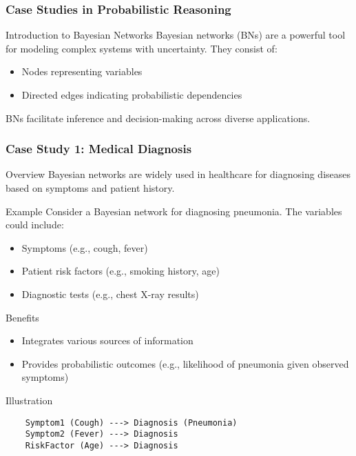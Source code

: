 \documentclass[aspectratio=169]{beamer}
\begin{document}
\begin{frame}[fragile]
    \frametitle{Case Studies in Probabilistic Reasoning}
    \begin{block}{Introduction to Bayesian Networks}
    Bayesian networks (BNs) are a powerful tool for modeling complex systems with uncertainty. They consist of:
    \begin{itemize}
        \item Nodes representing variables
        \item Directed edges indicating probabilistic dependencies
    \end{itemize}
    BNs facilitate inference and decision-making across diverse applications.
    \end{block}
\end{frame}

\begin{frame}[fragile]
    \frametitle{Case Study 1: Medical Diagnosis}
    \begin{block}{Overview}
    Bayesian networks are widely used in healthcare for diagnosing diseases based on symptoms and patient history.
    \end{block}

    \begin{block}{Example}
    Consider a Bayesian network for diagnosing pneumonia. The variables could include:
    \begin{itemize}
        \item Symptoms (e.g., cough, fever)
        \item Patient risk factors (e.g., smoking history, age)
        \item Diagnostic tests (e.g., chest X-ray results)
    \end{itemize}
    \end{block}

    \begin{block}{Benefits}
    \begin{itemize}
        \item Integrates various sources of information
        \item Provides probabilistic outcomes (e.g., likelihood of pneumonia given observed symptoms)
    \end{itemize}
    \end{block}

    \begin{block}{Illustration}
    \begin{verbatim}
    Symptom1 (Cough) ---> Diagnosis (Pneumonia)
    Symptom2 (Fever) ---> Diagnosis 
    RiskFactor (Age) ---> Diagnosis
    \end{verbatim}
    \end{block}
\end{frame}
\end{document}
